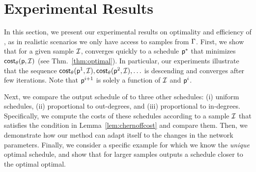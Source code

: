 \section{Experimental Results}\label{sec:exp}
In this section, we present our experimental results on optimality and
efficiency of \algonameapx, as in realistic scenarios we only have access to
samples from $\Gamma$. First, we show that for a given sample $\mathcal{I}$,
\algonameapx 
converges quickly to a schedule $\mathsf{p}^*$ that minimizes $\mathsf{cost}_\theta(\mathsf{p},
\mathcal{I})$ (see Thm.~\ref{thm:optimal}). In particular, our experiments
illustrate that the sequence $\mathsf{cost}_\theta(\mathsf{p}^1,\mathcal{I}), \mathsf{cost}_\theta(\mathsf{p}^2, \mathcal{I}),
\ldots$ is descending and converges after few iterations.  Note that
$\mathsf{p}^{i+1}$ is solely a function of $\mathcal{I}$ and $\mathsf{p}^i$. 

Next, we compare the output schedule of \algonameapx to three other schedules: (i) uniform schedules, (ii) proportional to out-degrees, and (iii) proportional to in-degrees. Specifically, we compute the costs of these schedules according to a sample $\mathcal{I}$ that satisfies the condition in Lemma~\ref{lem:chernoffcost} and compare them.
Then, we demonstrate how our method can adapt itself to the changes in the network parameters. Finally, we consider a specific example for which we know the \emph{unique} optimal schedule, and show that for larger samples \algonameapx outputs a schedule closer to the optimal optimal.



